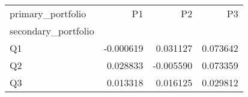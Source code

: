 \begin{tabular}{lrrr}
\toprule
primary_portfolio & P1 & P2 & P3 \\
secondary_portfolio &  &  &  \\
\midrule
Q1 & -0.000619 & 0.031127 & 0.073642 \\
Q2 & 0.028833 & -0.005590 & 0.073359 \\
Q3 & 0.013318 & 0.016125 & 0.029812 \\
\bottomrule
\end{tabular}
